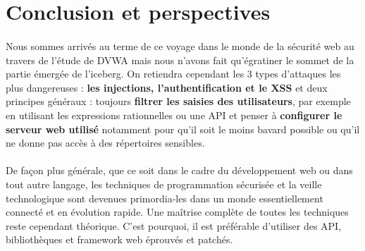 \section{Conclusion et perspectives}


\paragraph{} 
\justify 
Nous sommes arrivés au terme de ce voyage dans le monde de la sécurité web au travers de l'étude de DVWA mais nous n'avons fait qu'égratiner le sommet de la partie émergée de l'iceberg. On retiendra cependant les 3 types d'attaques les plus dangereuses : \textbf{ les injections, l'authentification et le XSS} et deux principes généraux : toujours \textbf{filtrer les saisies des utilisateurs}, par exemple en utilisant les expressions rationnelles ou une API et penser à \textbf{configurer le serveur web utilisé} notamment pour qu'il soit le moins bavard possible ou qu'il ne donne pas accès à des répertoires sensibles.  

\paragraph{} De façon plus générale, que ce soit dans le cadre du développement web ou dans tout autre langage, les techniques de programmation sécurisée et la veille technologique sont devenues primordia-les dans un monde essentiellement connecté et en évolution rapide. Une maîtrise complète de toutes les techniques reste cependant théorique. C'est pourquoi, il est préférable d'utiliser des API, bibliothèques et framework web éprouvés et patchés.

